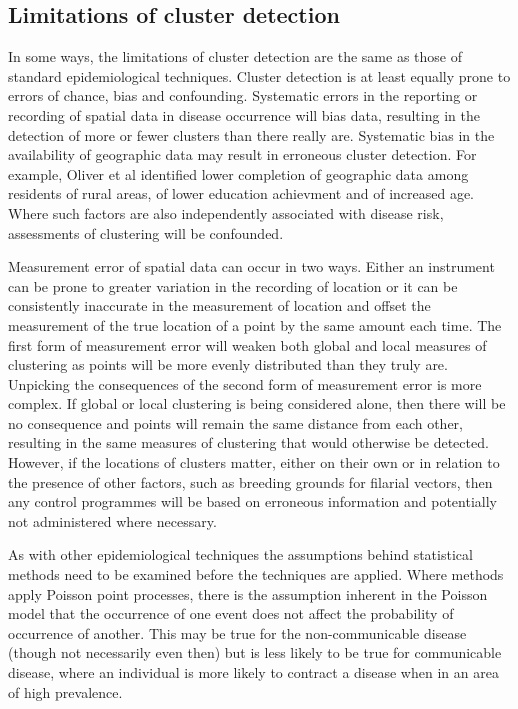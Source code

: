 \documentclass[11pt,a4paper]{article}
\begin{document}
\subsection{Limitations of cluster detection}
In some ways, the limitations of cluster detection are the same as those of standard epidemiological techniques. 
Cluster detection is at least equally prone to errors of chance, bias and confounding. 
Systematic errors in the reporting or recording of spatial data in disease occurrence will bias data, resulting in the detection of more or fewer clusters than there really are. 
Systematic bias in the availability of geographic data may result in erroneous cluster detection. 
For example, Oliver et al identified lower completion of geographic data among residents of rural areas, of lower education achievment and of increased age. \cite{Oliver2005}
Where such factors are also independently associated with disease risk, assessments of clustering will be confounded. 

Measurement error of spatial data can occur in two ways. 
Either an instrument can be prone to greater variation in the recording of location or it can be consistently inaccurate in the measurement of location and offset the measurement of the true location of a point by the same amount each time. 
The first form of measurement error will weaken both global and local measures of clustering as points will be more evenly distributed than they truly are. 
Unpicking the consequences of the second form of measurement error is more complex. 
If global or local clustering is being considered alone, then there will be no consequence and points will remain the same distance from each other, resulting in the same measures of clustering that would otherwise be detected.
However, if the locations of clusters matter, either on their own or in relation to the presence of other factors, such as breeding grounds for filarial vectors, then any control programmes will be based on erroneous information and potentially not administered where necessary. 

As with other epidemiological techniques the assumptions behind statistical methods need to be examined before the techniques are applied. 
Where methods apply Poisson point processes, there is the assumption inherent in the Poisson model that the occurrence of one event does not affect the probability of occurrence of another. 
This may be true for the non-communicable disease (though not necessarily even then) but is less likely to be true for communicable disease, where an individual is more likely to contract a disease when in an area of high prevalence. \cite{Kirkwood2003}
\end{document}
